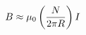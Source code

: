 \documentclass[preview]{standalone}
\begin{document}
\begin{align*}
\special{dvisvgm:raw <g id='unique000'>}B\approx\mu_0\left(\frac{N}{2\pi R}\right)I\special{dvisvgm:raw </g>}
\end{align*}
\end{document}
